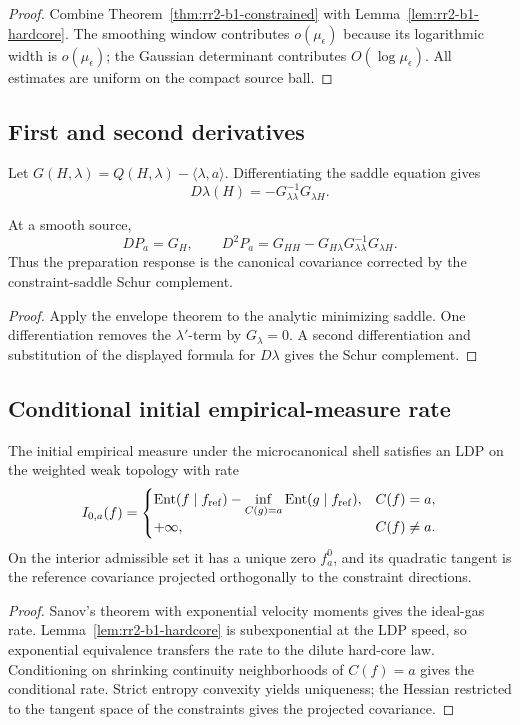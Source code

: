 \begin{proof}
Combine Theorem~\ref{thm:rr2-b1-constrained} with
Lemma~\ref{lem:rr2-b1-hardcore}.  The smoothing window contributes
\(o(\mu_\epsilon)\) because its logarithmic width is \(o(\mu_\epsilon)\);
the Gaussian determinant contributes \(O(\log\mu_\epsilon)\).  All estimates
are uniform on the compact source ball.
\end{proof}

\subsection{First and second derivatives}

Let \(G(H,\lambda)=Q(H,\lambda)-\langle\lambda,a\rangle\).  Differentiating
the saddle equation gives
\[
 D\lambda(H)
 =
 -G_{\lambda\lambda}^{-1}G_{\lambda H}.
\]

\begin{proposition}
\label{prop:rr2-b1-schur}
At a smooth source,
\[
 DP_a=G_H,\qquad
 D^2P_a
 =
 G_{HH}
 -
 G_{H\lambda}G_{\lambda\lambda}^{-1}G_{\lambda H}.
\]
Thus the preparation response is the canonical covariance corrected by the
constraint-saddle Schur complement.
\end{proposition}

\begin{proof}
Apply the envelope theorem to the analytic minimizing saddle.  One
differentiation removes the \(\lambda'\)-term by \(G_\lambda=0\).
A second differentiation and substitution of the displayed formula for
\(D\lambda\) gives the Schur complement.
\end{proof}

\subsection{Conditional initial empirical-measure rate}

\begin{theorem}
\label{thm:rr2-b1-initial-ldp}
The initial empirical measure under the microcanonical shell satisfies an LDP
on the weighted weak topology with rate
\[
 I_{0,a}(f)=
 \begin{cases}
 \operatorname{Ent}(f\mid f_{\rm ref})
 -\displaystyle\inf_{C(g)=a}
  \operatorname{Ent}(g\mid f_{\rm ref}),
 & C(f)=a,\\[1ex]
 +\infty,& C(f)\ne a.
 \end{cases}
\]
On the interior admissible set it has a unique zero \(f_a^0\), and its
quadratic tangent is the reference covariance projected orthogonally to the
constraint directions.
\end{theorem}

\begin{proof}
Sanov's theorem with exponential velocity moments gives the ideal-gas rate.
Lemma~\ref{lem:rr2-b1-hardcore} is subexponential at the LDP speed, so
exponential equivalence transfers the rate to the dilute hard-core law.
Conditioning on shrinking continuity neighborhoods of \(C(f)=a\) gives the
conditional rate.  Strict entropy convexity yields uniqueness; the Hessian
restricted to the tangent space of the constraints gives the projected
covariance.
\end{proof}
